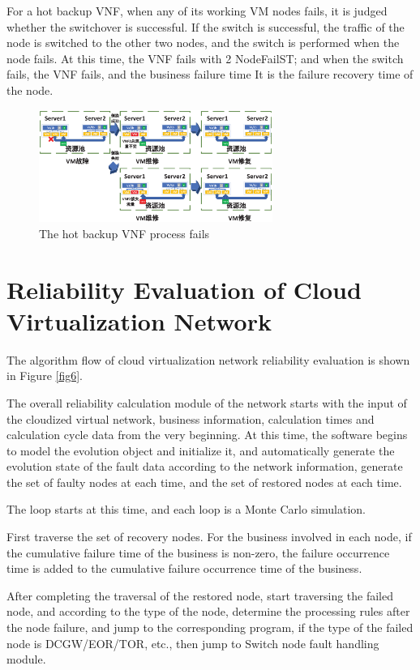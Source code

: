 \documentclass[journal]{IEEEtran}
\begin{document}
    For a hot backup VNF, when any of its working VM nodes fails, it is judged whether the switchover is successful. If the switch is successful, the traffic of the node is switched to the other two nodes, and the switch is performed when the node fails. At this time, the VNF fails with 2 NodeFailST; and when the switch fails, the VNF fails, and the business failure time It is the failure recovery time of the node.

    \begin{figure}[!t]
        \begin{center}
            \includegraphics[width = 3in]{img/8.eps}
            \caption{The hot backup VNF process fails}
            \label{fig5}
        \end{center}
    \end{figure}


    \section{Reliability Evaluation of Cloud Virtualization Network}
    The algorithm flow of cloud virtualization network reliability evaluation is shown in Figure \ref{fig6}.


    The overall reliability calculation module of the network starts with the input of the cloudized virtual network, business information, calculation times and calculation cycle data from the very beginning. At this time, the software begins to model the evolution object and initialize it, and automatically generate the evolution state of the fault data according to the network information, generate the set of faulty nodes at each time, and the set of restored nodes at each time.

    The loop starts at this time, and each loop is a Monte Carlo simulation.

    First traverse the set of recovery nodes. For the business involved in each node, if the cumulative failure time of the business is non-zero, the failure occurrence time is added to the cumulative failure occurrence time of the business.

    After completing the traversal of the restored node, start traversing the failed node, and according to the type of the node, determine the processing rules after the node failure, and jump to the corresponding program, if the type of the failed node is DCGW/EOR/TOR, etc., then jump to Switch node fault handling module.
\end{document}
